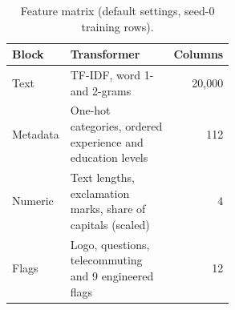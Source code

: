 \begin{table}[htbp]
\centering
\small
\begin{tabular}{l>{\raggedright\arraybackslash}p{0.55\linewidth}r}
\toprule
\textbf{Block} & \textbf{Transformer} & \textbf{Columns} \\
\midrule
Text & TF-IDF, word 1- and 2-grams & 20,000 \\
Metadata & One-hot categories, ordered experience and education levels & 112 \\
Numeric & Text lengths, exclamation marks, share of capitals (scaled) & 4 \\
Flags & Logo, questions, telecommuting and 9 engineered flags & 12 \\
\bottomrule
\end{tabular}
\caption{Feature matrix (default settings, seed-0 training rows).}
\label{tab:features}
\end{table}
